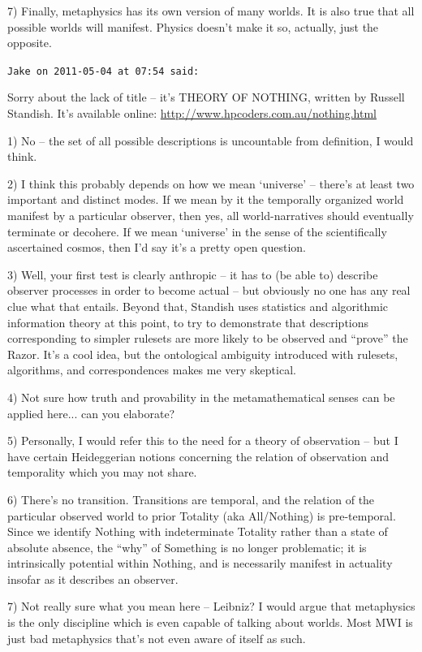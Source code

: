 \begin{footnotesize}
\begin{sffamily}
7) Finally, metaphysics has its own version of many worlds. It is also true that all possible worlds will manifest. Physics doesn't make it so, actually, just the opposite.

\hfill

\texttt{Jake on 2011-05-04 at 07:54 said:}

Sorry about the lack of title -- it's THEORY OF NOTHING, written by Russell Standish. It's available online:
\url{http://www.hpcoders.com.au/nothing.html}


1) No -- the set of all possible descriptions is uncountable from definition, I would think.

2) I think this probably depends on how we mean `universe' -- there's at least two important and distinct modes. If we mean by it the temporally organized world manifest by a particular observer, then yes, all world-narratives should eventually terminate or decohere. If we mean `universe' in the sense of the scientifically ascertained cosmos, then I'd say it's a pretty open question.

3) Well, your first test is clearly anthropic -- it has to (be able to) describe observer processes in order to become actual -- but obviously no one has any real clue what that entails. Beyond that, Standish uses statistics and algorithmic information theory at this point, to try to demonstrate that descriptions corresponding to simpler rulesets are more likely to be observed and ``prove'' the Razor. It's a cool idea, but the ontological ambiguity introduced with rulesets, algorithms, and correspondences makes me very skeptical.

4) Not sure how truth and provability in the metamathematical senses can be applied here... can you elaborate?

5) Personally, I would refer this to the need for a theory of observation -- but I have certain Heideggerian notions concerning the relation of observation and temporality which you may not share.

6) There's no transition. Transitions are temporal, and the relation of the particular observed world to prior Totality (aka All/Nothing) is pre-temporal. Since we identify Nothing with indeterminate Totality rather than a state of absolute absence, the ``why'' of Something is no longer problematic; it is intrinsically potential within Nothing, and is necessarily manifest in actuality insofar as it describes an observer.

7) Not really sure what you mean here -- Leibniz? I would argue that metaphysics is the only discipline which is even capable of talking about worlds. Most MWI is just bad metaphysics that's not even aware of itself as such.

\end{sffamily}
\end{footnotesize}

